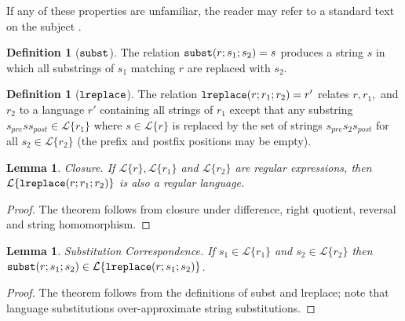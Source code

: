 \documentclass[9pt]{sig-alternate}
\newtheorem{lem}[thm]{Lemma}
\theoremstyle{definition}
\newtheorem{defn}[thm]{Definition}
\newcommand{\Lagr}{\mathcal{L}}
\newcommand{\lang}[1]{\Lagr\{#1\}}
\newcommand{\lsubst}[3]{{\tt subst}(#1;#2;#3)} %
\newcommand{\lreplace}[3]{{\tt lreplace}(#1; #2; #3)}
\begin{document}
If any of these properties are unfamiliar, the reader may refer to a standard text on the subject \cite{cinderella}.

\begin{defn}[$\tt{subst}$]
The relation $\lsubst{r}{s_1}{s_2} = s$ produces a string $s$ in which all substrings of $s_1$ matching $r$ are replaced with $s_2$.
\end{defn}

\begin{defn}[$\tt{lreplace}$]
  The relation $\lreplace{r}{r_1}{r_2} = r'$ relates $r, r_1,$ and $r_2$ to
  a language $r'$ containing all strings of $r_1$ except that any substring $s_{pre} s s_{post} \in \lang{r_1}$ where $s \in \lang{r}$
  is replaced by the set of strings $s_{pre} s_2 s_{post}$ for all $s_2 \in \lang{r_2}$ (the prefix and postfix positions may be empty).
\end{defn}

\begin{lem}{Closure.} \label{thm:total}
  If $\lang{r}, \lang{r_1}$ and $\lang{r_2}$ are regular expressions, then $\lang{\lreplace{r}{r_1}{r_2}}$ is also a regular language.
\end{lem}
\begin{proof}
The theorem follows from closure under difference, right quotient, reversal and string homomorphism.
\end{proof}

\begin{lem}{Substitution Correspondence.} \label{thm:substcorrespondence}
  If $s_1 \in \lang{r_1}$ and $s_2 \in \lang{r_2}$ then $\lsubst{r}{s_1}{s_2} \in \lang{\lreplace{r}{s_1}{s_2}}$.
\end{lem}
\begin{proof}
The theorem follows from the definitions of subst and lreplace; note that language substitutions over-approximate string substitutions.
\end{proof}
\end{document}
